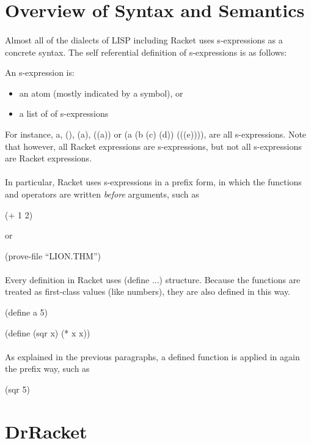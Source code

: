 \documentclass[11pt]{report}
\begin{document}
\begin{appendices}
\section{Overview of Syntax and Semantics}
\label{section:plai}

\paragraph{} Almost all of the dialects of LISP including Racket uses s-expressions as a concrete syntax. The self referential definition of s-expressions is as follows:

An s-expression is:
\begin{itemize}
 \item an atom (mostly indicated by a symbol), or
 \item a list of of s-expressions
\end{itemize}

For instance, a, (), (a), ((a)) or (a (b (c) (d)) (((e)))), are all s-expressions. Note that however, all Racket expressions are s-expressions, but not all s-expressions are Racket expressions.

\paragraph{} In particular, Racket uses s-expressions in a prefix form, in which the functions and operators are written \emph{before} arguments, such as

(+ 1 2)

or

(prove-file ``LION.THM'')

\paragraph{} Every definition in Racket uses (define ...) structure. Because the functions are treated as first-class values (like numbers), they are also defined in this way.

(define a 5)

(define (sqr x) (* x x))

\paragraph{} As explained in the previous paragraphs, a defined function is applied in again the prefix way, such as

(sqr 5)

\section{DrRacket}


\end{appendices}
\end{document}
